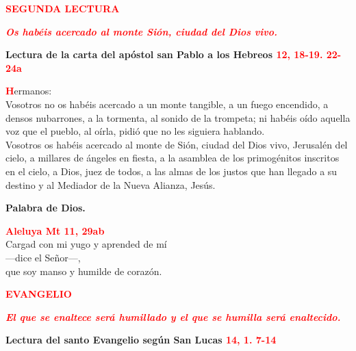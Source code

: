 \documentclass[12pt, letterpaper]{article}
\begin{document}
    \newpage

    \begin{center}
    \Large {\bfseries \textcolor{red}{SEGUNDA LECTURA}}
    \end{center}

    \begin{center}
    \large {\bfseries \textit{ \textcolor{red}{Os habéis acercado al monte Sión, ciudad del Dios vivo.}}}
    \end{center}

    \Large {\bfseries Lectura de la carta del ap\'ostol san Pablo a los Hebreos \hspace{1cm} \textcolor{red}{12, 18-19. 22-24a}}

    \lettrine[lines=2]{\bfseries \textcolor{red}{H}}{}\Large ermanos:\\
    Vosotros no os habéis acercado a un monte tangible, a un fuego encendido, a densos nubarrones, a la tormenta, al sonido de la trompeta; ni habéis oído aquella voz que el pueblo, al oírla, pidió que no les siguiera hablando.\\
    Vosotros os habéis acercado al monte de Sión, ciudad del Dios vivo, Jerusalén del cielo, a millares de ángeles en fiesta, a la asamblea de los primogénitos inscritos en el cielo, a Dios, juez de todos, a las almas de los justos que han llegado a su destino y al Mediador de la Nueva Alianza, Jesús.

    {\bfseries Palabra de Dios.}

    \begin{center}
    \Large {\bfseries \textcolor{red}{Aleluya \hspace{1cm} Mt 11, 29ab}}\\
    Cargad con mi yugo y aprended de mí\\
    —dice el Señor—,\\
    que soy manso y humilde de corazón.
    \end{center}

    \newpage

    \begin{center}
    \Large {\bfseries \textcolor{red}{EVANGELIO}}
    \end{center}

    \begin{center}
    \large {\bfseries \textit{ \textcolor{red}{El que se enaltece será humillado y el que se humilla será enaltecido.}}}
    \end{center}

    \Huge \textcolor{red}{} \Large {\bfseries Lectura del santo Evangelio seg\'un San Lucas \hspace{1cm} \textcolor{red}{14, 1. 7-14}}
\end{document}
